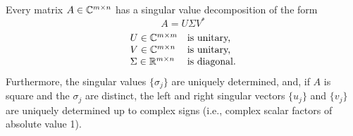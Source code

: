 \begin{theorem}
Every matrix $A\in{\mathbb C}^{m\times n}$ has a singular value decomposition of the form
\begin{equation}
A=U\Sigma V^*
\label{eq:NLA:SVD1}
\end{equation}
\[
\begin{array}{ll}
U\in{\mathbb C}^{m\times m}& \text{is unitary,}\\
V\in{\mathbb C}^{m\times n}& \text{is unitary,}\\
\Sigma\in{\mathbb R}^{m\times n} &\text{is diagonal.}
\end{array}
\]
Furthermore, the singular values $\{\sigma_j\}$ are uniquely determined, and, if $A$ is square and the $\sigma_j$ are distinct, the left and right singular vectors $\{u_j\}$ and $\{v_j\}$ are uniquely determined up to complex signs (i.e., complex scalar factors of absolute value 1).
\end{theorem}

